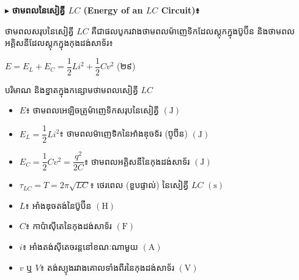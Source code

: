 \vspace{0.8em}
\noindent
$\blacktriangleright$ \textbf{\textcolor{khmerred}{\large ថាមពលនៃសៀគ្វី $LC$ ({\englishfont Energy of an $LC$ Circuit})៖}}
\par\vspace{3pt}
ថាមពលសរុបនៃសៀគ្វី $LC$ គឺជាផលបូករវាងថាមពលម៉ាញេទិកដែលស្តុកក្នុងប៊ូប៊ីន និងថាមពលអគ្គិសនីដែលស្តុកក្នុងកុងដង់សាទ័រ៖
\begin{center}
	$\boxed{E = E_L + E_C = \dfrac{1}{2}Li^2 + \dfrac{1}{2}Cv^2}$ \quad (២៩)
\end{center}

\vspace{0.3em}

\begin{formulabox}[breakable=false, fonttitle=\normalfont]{
    \khmermoul បរិមាណ និងខ្នាតក្នុងកន្សោមថាមពលសៀគ្វី $LC$}
	\begin{itemize}[itemsep=3pt, topsep=2pt, parsep=0pt, leftmargin=1.6em]
		\item $E$៖ ថាមពលអេឡិចត្រូម៉ាញេទិកសរុបនៃសៀគ្វី $(\mathrm{J})$
		\item $E_L = \dfrac{1}{2}Li^2$៖ ថាមពលម៉ាញេទិកនៃអាំងឌុចទ័រ (ប៊ូប៊ីន) $(\mathrm{J})$
		\item $E_C = \dfrac{1}{2}Cv^2 = \dfrac{q^2}{2C}$៖ ថាមពលអគ្គិសនីនៃកុងដង់សាទ័រ $(\mathrm{J})$
		\item $\tau_{LC} = T = 2\pi\sqrt{LC}$៖ ថេរពេល (ខួបផ្ទាល់) នៃសៀគ្វី $LC$ $(\mathrm{s})$
		\item $L$៖ អាំងឌុចតង់នៃប៊ូប៊ីន $(\mathrm{H})$
		\item $C$៖ កាប៉ាស៊ីតេនៃកុងដង់សាទ័រ $(\mathrm{F})$
		\item $i$៖ អាំងតង់ស៊ីតេចរន្តនៅខណៈណាមួយ $(\mathrm{A})$
		\item $v \text{ ឬ } V$៖ តង់ស្យុងរវាងគោលទាំងពីរនៃកុងដង់សាទ័រ $(\mathrm{V})$
	\end{itemize}
\end{formulabox}

\vspace{0.4em}

